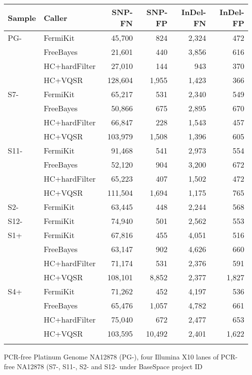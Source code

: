 \documentclass{bioinfo}
\begin{document}
\begin{table}[t]
{\footnotesize
\begin{tabular}{lp{1.7cm}rrrr}
\toprule
Sample & Caller     & SNP-FN & SNP-FP & InDel-FN & InDel-FP \\
\midrule
PG- & FermiKit      & 45,700 & 824    & 2,324    & 472 \\
	& FreeBayes     & 21,601 & 440    & 3,856    & 616 \\
    & HC+hardFilter & 27,010 & 144    & 943      & 370 \\
	& HC+VQSR       & 128,604& 1,955  & 1,423    & 366 \\
S7- & FermiKit      & 65,217 & 531    & 2,340    & 549 \\
	& FreeBayes     & 50,866 & 675    & 2,895    & 670 \\
    & HC+hardFilter & 66,847 & 228    & 1,543    & 457 \\
	& HC+VQSR       & 103,979& 1,508  & 1,396    & 605 \\
S11-& FermiKit      & 91,468 & 541    & 2,973    & 554 \\
	& FreeBayes     & 52,120 & 904    & 3,200    & 672 \\
	& HC+hardFilter & 65,223 & 407    & 1,502    & 472 \\
	& HC+VQSR       & 111,504& 1,694  & 1,175    & 765 \\
S2- & FermiKit      & 63,445 & 448    & 2,244    & 568 \\
S12-& FermiKit      & 74,940 & 501    & 2,562    & 553 \\
S1+ & FermiKit      & 67,816 & 455    & 4,051    & 516 \\
	& FreeBayes     & 63,147 & 902    & 4,626    & 660 \\
    & HC+hardFilter & 71,174 & 531    & 2,376    & 591 \\
	& HC+VQSR       & 108,101& 8,852  & 2,377    & 1,827 \\
S4+ & FermiKit      & 71,262 & 452    & 4,197    & 536 \\
	& FreeBayes     & 65,476 & 1,057  & 4,782    & 661 \\
	& HC+hardFilter & 75,040 & 672    & 2,477    & 653 \\
	& HC+VQSR       & 103,595& 10,492 & 2,401    & 1,622 \\
\botrule
\end{tabular}}{PCR-free Platinum Genome NA12878 (PG-), four Illumina X10 lanes
of PCR-free NA12878 (S7-, S11-, S2- and S12- under BaseSpace project ID
}
\end{table}
\end{document}
